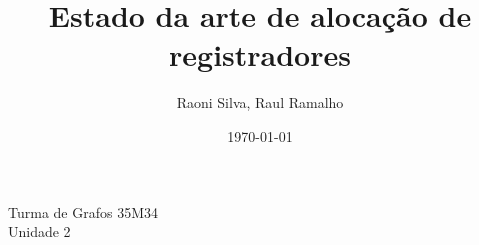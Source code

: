 \documentclass[a4paper,12pt]{article}
\title{Estado da arte de alocação de registradores}
\author{Raoni Silva, Raul Ramalho}
\date{\today}
\begin{document}
\maketitle

\noindent Turma de Grafos 35M34 \\ Unidade 2

\newpage

\tableofcontents












\end{document}
